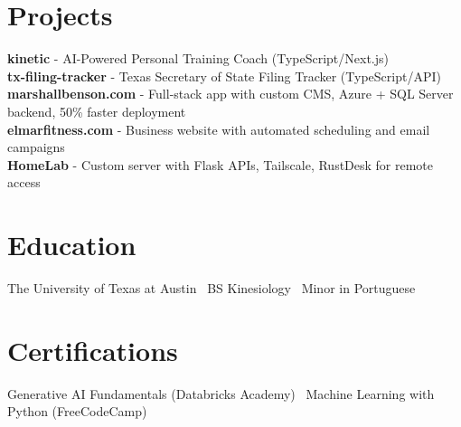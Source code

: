 \documentclass[letterpaper,10pt]{article}
\begin{document}
\section*{Projects}
\textbf{kinetic} - AI-Powered Personal Training Coach (TypeScript/Next.js) \\
\textbf{tx-filing-tracker} - Texas Secretary of State Filing Tracker (TypeScript/API) \\
\textbf{marshallbenson.com} - Full-stack app with custom CMS, Azure + SQL Server backend, 50\% faster deployment \\
\textbf{elmarfitness.com} - Business website with automated scheduling and email campaigns \\
\textbf{HomeLab} - Custom server with Flask APIs, Tailscale, RustDesk for remote access

\section*{Education}
The University of Texas at Austin \textbar\ BS Kinesiology \textbar\ Minor in Portuguese 

\section*{Certifications}
Generative AI Fundamentals (Databricks Academy) \textbar\ Machine Learning with Python (FreeCodeCamp) 
\end{document}
